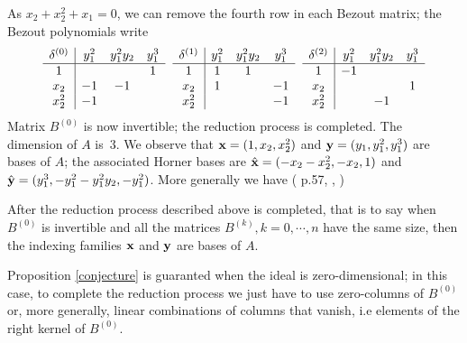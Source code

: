 \documentclass{standalone}
\begin{document}
As $x_2 + x_2^{2} + x_1 = 0$, we can remove the fourth row in each Bezout matrix; the Bezout polynomials write
$$
\begin{array}{c|ccc}
	\delta^{(0)} & y_1^2 & y_1^2y_2 & y_1^3 \\
	\hline
	1  &  &  & 1 \\
	x_2  & -1 & -1 & \\
	x_2^2 & -1 &  &
\end{array}
\hspace{0.2cm}
\begin{array}{c|ccc}
	\delta^{(1)} & y_1^2 & y_1^2y_2 & y_1^3 \\
	\hline
	1  & 1 & 1 & \\
	x_2  & 1 &  & -1\\
	x_2^2  &  &  & -1
\end{array}
\hspace{0.2cm}
\begin{array}{c|ccc}
	\delta^{(2)} & y_1^2 & y_1^2y_2 & y_1^3 \\
	\hline
	1  & -1 &  & \\
	x_2  &  &  & 1 \\
	x_2^2  &  & -1 &
\end{array}$$
Matrix $B^{(0)}$ is now invertible; the reduction process is completed. The dimension of $A$ is~$3$. We observe that $\bold{x} = (1, x_2, x_2^{2})$ and $\bold{y} = (y_1, y_1^{2}, y_1^{3})$ are bases of $A$; the associated Horner bases are $\hat{\bold{x}} = (-x_2-x_2^{2}, -x_{2}, 1)$ and $\hat{\bold{y}} = (y_1^{3}, -y_1^{2}-y_1^{2}y_2, -y_1^{2})$.
More generally we have (\cite{jpc} p.57, \cite{bm}, \cite{tm})
\begin{prop}
\label{conjecture}
After the reduction process described above is completed, that is to say when $B^{(0)}$ is invertible and all the matrices $B^{(k)}, k=0, \cdots, n$ have the same size, then the indexing families $\bold{x}$ and $\bold{y}$ are bases of $A$.
\end{prop}

\begin{rem}
Proposition \ref{conjecture} is guaranted when the ideal is zero-dimensional; in this case, to complete the reduction process we just have to use zero-columns of $B^{(0)}$ or, more generally, linear combinations of columns that vanish, i.e elements of the right kernel of $B^{(0)}$.
\end{rem}
\end{document}

